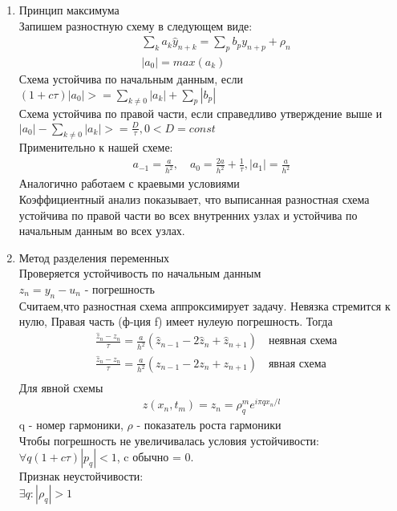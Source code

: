 \documentclass[12pt,a4paper]{article}
\begin{document}
	\begin{enumerate}
		\item Принцип максимума\\
		Запишем разностную схему в следующем виде:\\
		\begin{align*}
		&\sum_{k}a_k \hat{y}_{n+k} = \sum_{p} b_p y_{n+p} + \rho_n\\
		&|a_0| = max(a_k)
		\end{align*}
		Схема устойчива по начальным данным, если $(1+c\tau)|a_0|>= \sum_{k\neq 0}|a_k|+\sum_{p}|b_p|$\\
		Схема устойчива по правой части, если справедливо утверждение выше и $|a_0| - \sum_{k \neq 0}|a_k| >= \frac{D}{\tau}, 0< D = const$\\
		Применительно к нашей схеме:
		\begin{align*}
		a_{-1} = \frac{a}{h^2}, \quad a_0 = \frac{2a}{h^2} + \frac{1}{\tau} , |a_1| = \frac{a}{h^2}
		\end{align*}
		Аналогично работаем с краевыми условиями\\
		Коэффициентный анализ показывает, что выписанная разностная схема устойчива по правой части во всех внутренних узлах и устойчива по начальным данным во всех узлах.
		\item Метод разделения переменных \\
		Проверяется устойчивость по начальным данным\\
		$z_n = y_n - u_n$ - погрешность\\
		Считаем,что разностная схема аппроксимирует задачу. Невязка стремится к нулю, Правая часть (ф-ция f) имеет нулеую погрешность. Тогда \\
		\begin{align*}
		&\frac{\hat{z}_n - z_n}{\tau}  =\frac{a}{h^2} \left( \hat{z}_{n-1} - 2\hat{z}_n + \hat{z}_{n+1} \right) \quad\text{неявная схема}\\
		&\frac{\hat{z}_n - z_n}{\tau}  =\frac{a}{h^2} \left( z_{n-1} - 2z_n + z_{n+1} \right) \quad\text{явная схема}\\
		\end{align*}
		Для явной схемы \\
		\begin{align*}
		z(x_n, t_m) = z_n = \rho^m_q e^{i \pi q x_n / l}
		\end{align*}
		q - номер гармоники, $\rho$ - показатель роста гармоники\\
		Чтобы погрешность не увеличивалась условия устойчивости:\\
		$\forall q (1 + c\tau) |p_q| < 1$, c обычно = 0.\\
		Признак неустойчивости:\\
		$\exists q: |\rho_q| >1$
	\end{enumerate}
\end{document}
